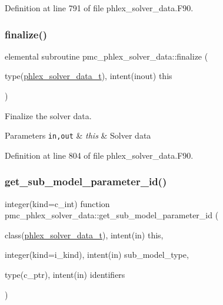 Definition at line 791 of file phlex\+\_\+solver\+\_\+data.\+F90.

\mbox{\label{namespacepmc__phlex__solver__data_afd20da14fccfdeabce1c2d4ffed4aec2}} 
\subsubsection{\texorpdfstring{finalize()}{finalize()}}
{\footnotesize\ttfamily elemental subroutine pmc\+\_\+phlex\+\_\+solver\+\_\+data\+::finalize (\begin{DoxyParamCaption}\item[{type(\mbox{\hyperlink{structpmc__phlex__solver__data_1_1phlex__solver__data__t}{phlex\+\_\+solver\+\_\+data\+\_\+t}}), intent(inout)}]{this }\end{DoxyParamCaption})\hspace{0.3cm}{\ttfamily [private]}}



Finalize the solver data. 


\begin{DoxyParams}[1]{Parameters}
\mbox{\tt in,out}  & {\em this} & Solver data \\
\hline
\end{DoxyParams}


Definition at line 804 of file phlex\+\_\+solver\+\_\+data.\+F90.

\mbox{\label{namespacepmc__phlex__solver__data_a9af2b98e55136169b2ad7a82dbb14a0e}} 
\subsubsection{\texorpdfstring{get\+\_\+sub\+\_\+model\+\_\+parameter\+\_\+id()}{get\_sub\_model\_parameter\_id()}}
{\footnotesize\ttfamily integer(kind=c\+\_\+int) function pmc\+\_\+phlex\+\_\+solver\+\_\+data\+::get\+\_\+sub\+\_\+model\+\_\+parameter\+\_\+id (\begin{DoxyParamCaption}\item[{class(\mbox{\hyperlink{structpmc__phlex__solver__data_1_1phlex__solver__data__t}{phlex\+\_\+solver\+\_\+data\+\_\+t}}), intent(in)}]{this,  }\item[{integer(kind=i\+\_\+kind), intent(in)}]{sub\+\_\+model\+\_\+type,  }\item[{type(c\+\_\+ptr), intent(in)}]{identifiers }\end{DoxyParamCaption})\hspace{0.3cm}{\ttfamily [private]}}



